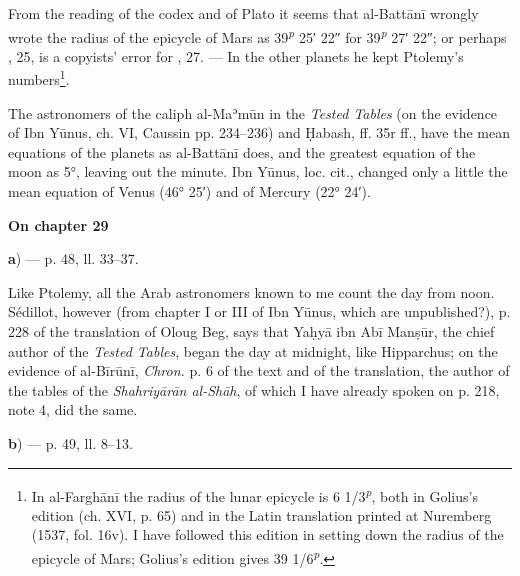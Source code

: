 \documentclass[11pt]{article}
\newcommand{\UnitHead}[2]{\par\setcounter{footnoteT}{0}\needspace{8\baselineskip}\bigskip\pdfbookmark[1]{#1}{unit-#2}\hypertarget{EN-#2}{}%
 {\large\bfseries\interlinepenalty=10000 #1\par}\nobreak\medskip}
\begin{document}
\par From the reading of the codex and of Plato it seems that al-Battānī wrongly wrote the radius of the epicycle of Mars as 39\textsuperscript{\itshape p} 25′ 22″ for 39\textsuperscript{\itshape p} 27′ 22″; or perhaps , 25, is a copyists' error for , 27. — In the other planets he kept Ptolemy's numbers\footnote{In al-Farghānī the radius of the lunar epicycle is 6 1/3\textsuperscript{\itshape p}, both in Golius's edition (ch. XVI, p. 65) and in the Latin translation printed at Nuremberg (1537, fol. 16v). I have followed this edition in setting down the radius of the epicycle of Mars; Golius's edition gives 39 1/6\textsuperscript{\itshape p}.}.\par
\par The astronomers of the caliph al-Maʾmūn in the \emph{Tested Tables} (on the evidence of Ibn Yūnus, ch. VI, Caussin pp. 234–236) and Ḥabash, ff. 35r ff., have the mean equations of the planets as al-Battānī does, and the greatest equation of the moon as 5°, leaving out the minute. Ibn Yūnus, loc. cit., changed only a little the mean equation of Venus (46° 25′) and of Mercury (22° 24′).\par
\UnitHead{On chapter 29}{A29}
\par\begin{center}\textbf{a}) — p. 48, ll. 33–37.\end{center}
\par Like Ptolemy, all the Arab astronomers known to me count the day from noon. Sédillot, however (from chapter I or III of Ibn Yūnus, which are unpublished?), p. 228 of the translation of Oloug Beg, says that Yaḥyā ibn Abī Manṣūr, the chief author of the \emph{Tested Tables}, began the day at midnight, like Hipparchus; on the evidence of al-Bīrūnī, \emph{Chron.} p. 6 of the text and of the translation, the author of the tables of the \emph{Shahriyārān al-Shāh}, of which I have already spoken on p. 218, note 4, did the same.\par
\par\begin{center}\textbf{b}) — p. 49, ll. 8–13.\end{center}
\end{document}
